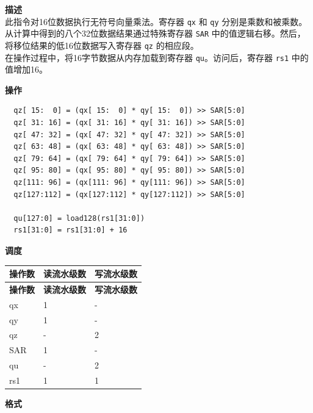 \textbf{描述}\\
此指令对16位数据执行无符号向量乘法。寄存器 \lstinline{qx} 和 \lstinline{qy} 分别是乘数和被乘数。从计算中得到的八个32位数据结果通过特殊寄存器 \lstinline{SAR} 中的值逻辑右移。然后，将移位结果的低16位数据写入寄存器 \lstinline{qz} 的相应段。\\ 在操作过程中，将16字节数据从内存加载到寄存器 \lstinline{qu}。访问后，寄存器 \lstinline{rs1} 中的值增加16。

\textbf{操作}\\
\begin{lstlisting}
  qz[ 15:  0] = (qx[ 15:  0] * qy[ 15:  0]) >> SAR[5:0]
  qz[ 31: 16] = (qx[ 31: 16] * qy[ 31: 16]) >> SAR[5:0]
  qz[ 47: 32] = (qx[ 47: 32] * qy[ 47: 32]) >> SAR[5:0]
  qz[ 63: 48] = (qx[ 63: 48] * qy[ 63: 48]) >> SAR[5:0]
  qz[ 79: 64] = (qx[ 79: 64] * qy[ 79: 64]) >> SAR[5:0]
  qz[ 95: 80] = (qx[ 95: 80] * qy[ 95: 80]) >> SAR[5:0]
  qz[111: 96] = (qx[111: 96] * qy[111: 96]) >> SAR[5:0]
  qz[127:112] = (qx[127:112] * qy[127:112]) >> SAR[5:0]

  qu[127:0] = load128(rs1[31:0])
  rs1[31:0] = rs1[31:0] + 16
\end{lstlisting}


\textbf{调度}\\
\begin{longtable}[c]{|l|l|l|}
    \hline
    \rowcolor{lightgray}
    \textbf{操作数} & \textbf{读流水级数} & \textbf{写流水级数} \\\hline
    \endfirsthead
    \hline
    \rowcolor{lightgray}
     \textbf{操作数} & \textbf{读流水级数} & \textbf{写流水级数} \\\hline
    \endhead
    \hline
    \endfoot

    qx & 1 & - \\\hline
  qy & 1 & - \\\hline
     qz & - & 2 \\\hline
    SAR & 1 & - \\\hline
    qu & - & 2 \\\hline
    rs1 & 1 & 1

\end{longtable}

\textbf{格式}\\

